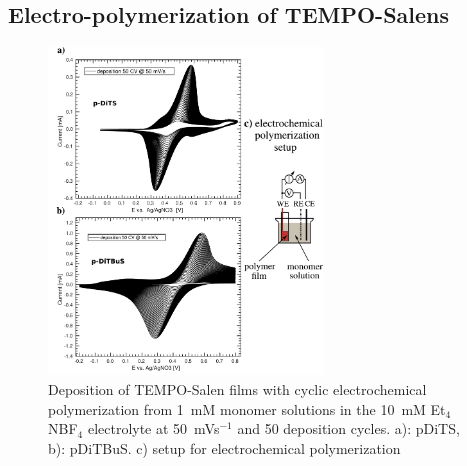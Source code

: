 \subsection{Electro-polymerization of TEMPO-Salens}
\begin{figure}[!ht]
\center
	\includegraphics[width=0.65\textwidth]{./electrochemistry/figures/DITBUS_DEPO.pdf}
	\caption{Deposition of TEMPO-Salen films with cyclic electrochemical polymerization from 1~mM monomer solutions in the 10~mM Et$_4$NBF$_4$ electrolyte at 50~mVs$^{-1}$ and 50 deposition cycles. a): pDiTS, b): pDiTBuS. c) setup for electrochemical polymerization}
	\label{fig:DITBUS_DEPO}
\end{figure}

